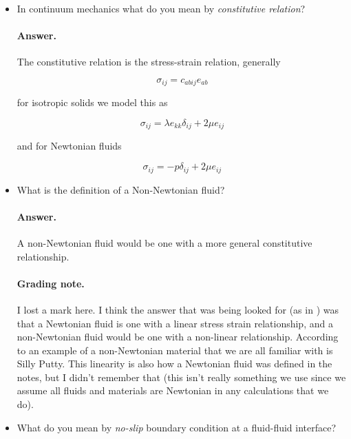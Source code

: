 \begin{itemize}
\item In continuum mechanics what do you mean by \textit{constitutive relation}?
\paragraph{Answer.}  The constitutive relation is the stress-strain relation, generally

\begin{equation}\label{eqn:continuumMidTermReflection:150}
\sigma_{ij} = c_{abij} e_{ab}
\end{equation}

for isotropic solids we model this as 

\begin{equation}\label{eqn:continuumMidTermReflection:170}
\sigma_{ij} = \lambda e_{kk} \delta_{ij} + 2 \mu e_{ij}
\end{equation}

and for Newtonian fluids

\begin{equation}\label{eqn:continuumMidTermReflection:190}
\sigma_{ij} = -p \delta_{ij} + 2 \mu e_{ij}
\end{equation}

\item What is the definition of a Non-Newtonian fluid?
\paragraph{Answer.}

A non-Newtonian fluid would be one with a more general constitutive relationship.

\paragraph{Grading note.}  I lost a mark here.  I think the answer that was being looked for (as in \cite{wiki:newtonianFluids}) was that a Newtonian fluid is one with a linear stress strain relationship, and a non-Newtonian fluid would be one with a non-linear relationship.  According to \cite{wiki:nonNewtonianFluid} an example of a non-Newtonian material that we are all familiar with is Silly Putty.  This linearity is also how a Newtonian fluid was defined in the notes, but I didn't remember that (this isn't really something we use since we assume all fluids and materials are Newtonian in any calculations that we do).

\item What do you mean by \emph{no-slip} boundary condition at a fluid-fluid interface?


\end{itemize}
